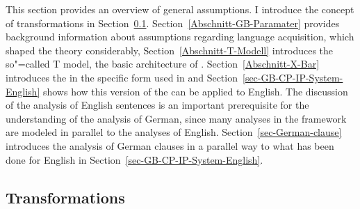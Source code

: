 This section provides an overview of general assumptions. I introduce the concept of transformations
in Section~\ref{Abschnitt-Transformationen}. Section~\ref{Abschnitt-GB-Paramater} provides
background information about assumptions regarding language acquisition, which shaped the theory
considerably, Section~\ref{Abschnitt-T-Modell} introduces the so"=called T model, the basic
architecture of \gbt. Section~\ref{Abschnitt-X-Bar} introduces the \xbart in the specific form used in \gb
and Section~\ref{sec-GB-CP-IP-System-English} shows how this version of the \xbart can be applied to English. The discussion of
the analysis of English sentences is an important prerequisite for the understanding of the analysis
of German, since many analyses in the \gb framework are modeled in parallel to the analyses of
English. Section~\ref{sec-German-clause} introduces the analysis of German clauses in a parallel way
to what has been done for English in Section~\ref{sec-GB-CP-IP-System-English}.

\subsection{Transformations}
\label{Abschnitt-Transformationen}

